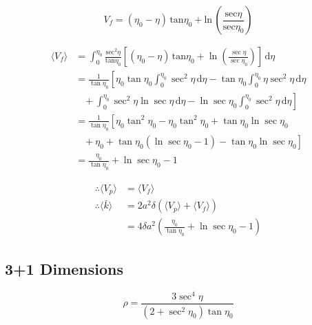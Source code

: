 \documentclass[12pt]{article}
\begin{document}
\begin{equation}
V_f = (\eta_0 - \eta) \, \mathrm{tan}\eta_0 + \mathrm{ln} \, \left(\frac{\mathrm{sec}\eta}{\mathrm{sec}\eta_0}\right)
\end{equation}

\begin{equation}
\begin{split}
\langle V_f \rangle &= \int_0^{\eta_0} \! \frac{\mathrm{sec}^2\eta}{\mathrm{tan}\eta_0} \left[ (\eta_0 - \eta) \, \mathrm{tan}\eta_0 + \ln\left(\frac{\sec\eta}{\sec\eta_0}\right) \right] \, \mathrm{d}\eta \\
  &= \frac{1}{\tan\eta_0} \left[ \eta_0\tan\eta_0 \int_0^{\eta_0} \! \sec^2\eta \, \mathrm{d}\eta - \tan\eta_0 \int_0^{\eta_0} \! \eta\sec^2\eta \, \mathrm{d}\eta \right. \\ & \left.\,\,\,\,\, + \int_0^{\eta_0} \! \sec^2\eta\ln\sec\eta \, \mathrm{d}\eta - \ln\sec\eta_0 \int_0^{\eta_0} \! \sec^2\eta \, \mathrm{d}\eta \right] \\
  &= \frac{1}{\tan\eta_0} \left[ \eta_0\tan^2\eta_0 - \eta_0\tan^2\eta_0 + \tan\eta_0\ln\sec\eta_0 \right. \\ & \left. \,\,\,\,\, + \eta_0 + \tan\eta_0\left(\ln\sec\eta_0 - 1\right) - \tan\eta_0\ln\sec\eta_0 \right] \\
  &= \frac{\eta_0}{\tan\eta_0} + \ln\sec\eta_0 - 1
\end{split}
\end{equation}

\begin{equation}
\begin{split}
\therefore \langle V_p \rangle &= \langle V_f \rangle \\
\therefore \langle \bar{k} \rangle &= 2a^2\delta \left( \langle V_p \rangle + \langle V_f \rangle \right) \\
  &= 4 \delta a^2 \left( \frac{\eta_0}{\tan\eta_0} + \ln\sec\eta_0 - 1 \right)
\end{split}
\end{equation}

\subsection{3+1 Dimensions}

\begin{equation}
\rho = \frac{3\sec^4\eta}{\left( 2 + \sec^2\eta_0 \right) \tan\eta_0}
\end{equation}
\end{document}
